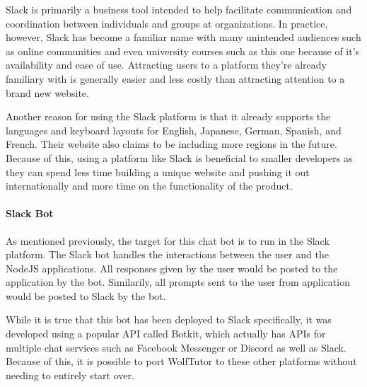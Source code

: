 
Slack is primarily a business tool intended to help facilitate
communication and coordination between individuals and groups at organizations.
In practice, however, Slack has become a familiar name with many unintended audiences such
as online communities and even university courses such as this one because of it's 
availability and ease of use. Attracting users to a platform they're already familiary with
is generally easier and less costly than attracting attention to a brand new website.

Another reason for using the Slack platform is that it already supports the languages and keyboard layouts for English, 
Japanese, German, Spanish, and French. Their website also claims to be 
including more regions in the future. Because of this, using a platform like Slack 
is beneficial to smaller developers as they can spend less time building a unique website 
and pushing it out internationally and more time on the functionality of the product. 

\paragraph{Slack Bot}
As mentioned previously, the target for this chat bot is to run in the Slack
platform. The Slack bot handles the interactions between the user and the NodeJS applications. 
All responses given by the user would be posted to the application by the bot. 
Similarily, all prompts sent to the user from application would be posted to Slack by the bot.

While it is true that this bot has been deployed to Slack specifically, it was
developed using a popular API called Botkit, which actually has APIs for
multiple chat services such as Facebook Messenger or Discord as well as Slack.
Because of this, it is possible to port WolfTutor to these other platforms
without needing to entirely start over.

